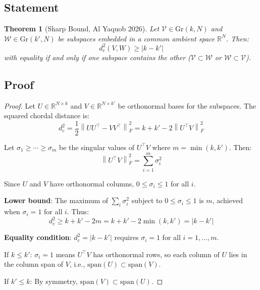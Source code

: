 \documentclass[11pt,a4paper]{article}
\newtheorem{theorem}{Theorem}[section]
\newcommand{\Gr}{\mathrm{Gr}}
\newcommand{\R}{\mathbb{R}}
\newcommand{\norm}[1]{\left\|#1\right\|}
\begin{document}
\subsection{Statement}

\begin{theorem}[Sharp Bound, Al Yaquob 2026]
\label{thm:sharp-bound}
Let $\mathcal{V} \in \Gr(k,N)$ and $\mathcal{W} \in \Gr(k',N)$ be subspaces embedded in a common ambient space $\R^N$. Then:
\begin{equation}
    d_c^2(V, W) \geq |k - k'|
\end{equation}
with equality if and only if one subspace contains the other ($\mathcal{V} \subset \mathcal{W}$ or $\mathcal{W} \subset \mathcal{V}$).
\end{theorem}

\subsection{Proof}

\begin{proof}
Let $U \in \R^{N \times k}$ and $V \in \R^{N \times k'}$ be orthonormal bases for the subspaces. The squared chordal distance is:
\begin{equation}
    d_c^2 = \frac{1}{2}\norm{UU^\top - VV^\top}_F^2 = k + k' - 2\norm{U^\top V}_F^2
\end{equation}

Let $\sigma_1 \geq \cdots \geq \sigma_m$ be the singular values of $U^\top V$ where $m = \min(k,k')$. Then:
\begin{equation}
    \norm{U^\top V}_F^2 = \sum_{i=1}^m \sigma_i^2
\end{equation}

Since $U$ and $V$ have orthonormal columns, $0 \leq \sigma_i \leq 1$ for all $i$.

\textbf{Lower bound}: The maximum of $\sum_i \sigma_i^2$ subject to $0 \leq \sigma_i \leq 1$ is $m$, achieved when $\sigma_i = 1$ for all $i$. Thus:
\begin{equation}
    d_c^2 \geq k + k' - 2m = k + k' - 2\min(k,k') = |k - k'|
\end{equation}

\textbf{Equality condition}: $d_c^2 = |k-k'|$ requires $\sigma_i = 1$ for all $i = 1,\ldots,m$.

If $k \leq k'$: $\sigma_i = 1$ means $U^\top V$ has orthonormal rows, so each column of $U$ lies in the column span of $V$, i.e., $\mathrm{span}(U) \subset \mathrm{span}(V)$.

If $k' \leq k$: By symmetry, $\mathrm{span}(V) \subset \mathrm{span}(U)$.
\end{proof}
\end{document}
